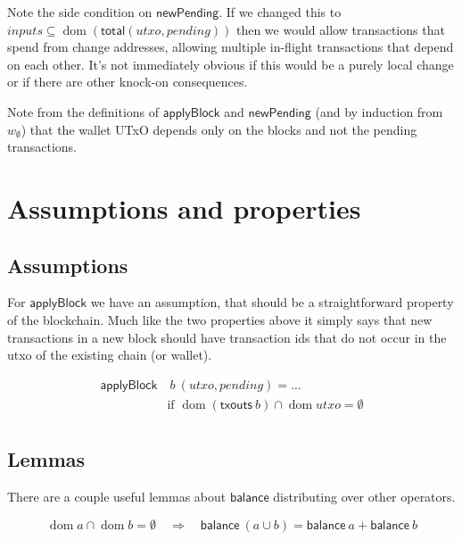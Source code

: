 \documentclass{article}
\DeclareMathOperator{\dom}{dom}
\begin{document}
Note the side condition on $\mathsf{newPending}$. If we changed this to
$inputs \subseteq \dom (\mathsf{total}(utxo, pending))$ then we would allow transactions
that spend from change addresses, allowing multiple in-flight transactions
that depend on each other. It's not immediately obvious if this would be a
purely local change or if there are other knock-on consequences.

Note from the definitions of $\mathsf{applyBlock}$ and $\mathsf{newPending}$
(and by induction from $w_\emptyset$) that the wallet UTxO depends only on the
blocks and not the pending transactions.



\section{Assumptions and properties}

\subsection{Assumptions}

For $\mathsf{applyBlock}$ we have an assumption, that should be a
straightforward property of the blockchain. Much like the two properties above
it simply says that new transactions in a new block should have transaction
ids that do not occur in the utxo of the existing chain (or wallet).

\begin{equation} \label{applyBlock_assumption}
\begin{split}
\mathsf{applyBlock} & ~ b ~ (utxo, pending) = \ldots \\
& \text{if } \dom (\mathsf{txouts} ~ b) \cap \dom utxo = \emptyset \\
\end{split}
\end{equation}


\subsection{Lemmas}

There are a couple useful lemmas about $\mathsf{balance}$ distributing over
other operators.

\begin{equation} \label{lemma_balance_minus}
  \dom a \cap \dom b = \emptyset \quad \Longrightarrow \quad
  \mathsf{balance} ~ (a \cup b) = \mathsf{balance} ~ a + \mathsf{balance} ~ b
\end{equation}
\end{document}
